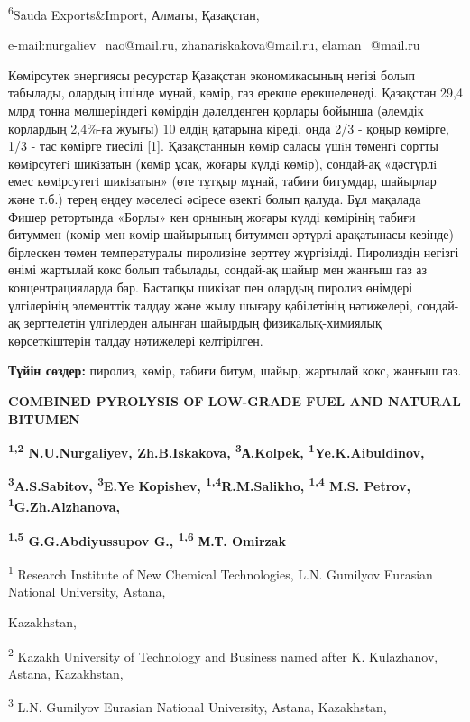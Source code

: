 \textsuperscript{6}Sauda Exports\&Import, Алматы, Қазақстан,

e-mail:nurgaliev\_nao@mail.ru, zhanariskakova@mail.ru, elaman\_@mail.ru

Көмірсутек энергиясы ресурстар Қазақстан экономикасының негізі болып
табылады, олардың ішінде мұнай, көмір, газ ерекше ерекшеленеді.
Қазақстан 29,4 млрд тонна мөлшеріндегі көмірдің дәлелденген қорлары
бойынша (әлемдік қорлардың 2,4\%-ға жуығы) 10 елдің қатарына кіреді,
онда 2/3 - қоңыр көмірге, 1/3 - тас көмірге тиесілі {[}1{]}.
Қазақстанның көмiр саласы үшiн төменгi сортты көмiрсутегi шикiзатын
(көмiр ұсақ, жоғары күлдi көмiр), сондай-ақ «дәстүрлi емес көмiрсутегi
шикiзатын» (өте тұтқыр мұнай, табиғи битумдар, шайырлар және т.б.) терең
өңдеу мәселесi әсiресе өзектi болып қалуда. Бұл мақалада Фишер
ретортында «Борлы» кен орнының жоғары күлді көмірінің табиғи битуммен
(көмір мен көмір шайырының битуммен әртүрлі арақатынасы кезінде)
бірлескен төмен температуралы пиролизіне зерттеу жүргізілді. Пиролиздің
негізгі өнімі жартылай кокс болып табылады, сондай-ақ шайыр мен жанғыш
газ аз концентрацияларда бар. Бастапқы шикізат пен олардың пиролиз
өнімдері үлгілерінің элементтік талдау және жылу шығару қабілетінің
нәтижелері, сондай-ақ зерттелетін үлгілерден алынған шайырдың
физикалық-химиялық көрсеткіштерін талдау нәтижелері келтірілген.

\textbf{Түйін сөздер:} пиролиз, көмір, табиғи битум, шайыр, жартылай
кокс, жанғыш газ.

\textbf{COMBINED PYROLYSIS OF LOW-GRADE FUEL AND NATURAL BITUMEN}

\textbf{\textsuperscript{1,2} N.U.Nurgaliyev, Zh.B.Iskakova,
\textsuperscript{3}А.Kolpek, \textsuperscript{1}Ye.K.Aibuldinov,}

\textbf{\textsuperscript{3}A.S.Sabitov, \textsuperscript{3}E.Ye
Kopishev, \textsuperscript{1,4}R.M.Salikho, \textsuperscript{1,4} M.S.
Petrov, \textsuperscript{1}G.Zh.Alzhanova,}

\textbf{\textsuperscript{1,5} G.G.Abdiyussupov G., \textsuperscript{1,6}
М.Т. Omirzak}

\textsuperscript{1} Research Institute of New Chemical Technologies,
L.N. Gumilyov Eurasian National University, Astana,

Kazakhstan,

\textsuperscript{2} Kazakh University of Technology and Business named
after K. Kulazhanov, Astana, Kazakhstan,

\textsuperscript{3} L.N. Gumilyov Eurasian National University, Astana,
Kazakhstan,

